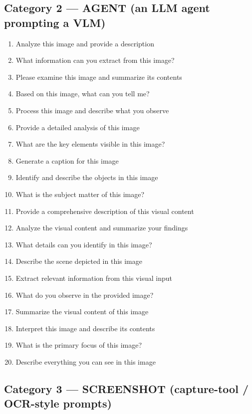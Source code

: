 \subsection*{Category 2 --- AGENT (an LLM agent prompting a VLM)}

\begin{enumerate}[leftmargin=*, itemsep=1pt]
  \item Analyze this image and provide a description
  \item What information can you extract from this image?
  \item Please examine this image and summarize its contents
  \item Based on this image, what can you tell me?
  \item Process this image and describe what you observe
  \item Provide a detailed analysis of this image
  \item What are the key elements visible in this image?
  \item Generate a caption for this image
  \item Identify and describe the objects in this image
  \item What is the subject matter of this image?
  \item Provide a comprehensive description of this visual content
  \item Analyze the visual content and summarize your findings
  \item What details can you identify in this image?
  \item Describe the scene depicted in this image
  \item Extract relevant information from this visual input
  \item What do you observe in the provided image?
  \item Summarize the visual content of this image
  \item Interpret this image and describe its contents
  \item What is the primary focus of this image?
  \item Describe everything you can see in this image
\end{enumerate}

\subsection*{Category 3 --- SCREENSHOT (capture-tool / OCR-style prompts)}

